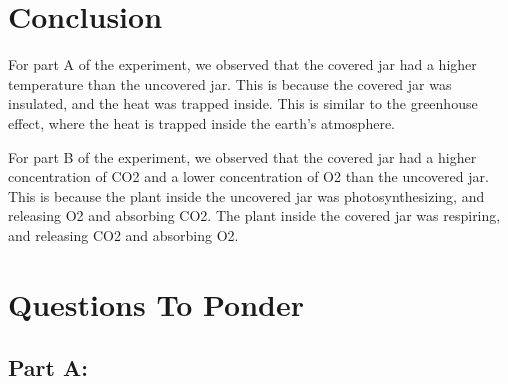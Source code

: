 \documentclass[a4paper, 12pt, english]{article}
\begin{document}
\section{Conclusion}
For part A of the experiment, we observed that the covered jar had a higher
temperature than the uncovered jar. This is because the covered jar was
insulated, and the heat was trapped inside. This is similar to the greenhouse
effect, where the heat is trapped inside the earth's atmosphere.

For part B of the experiment, we observed that the covered jar had a higher
concentration of CO2 and a lower concentration of O2 than the uncovered jar.
This is because the plant inside the uncovered jar was photosynthesizing, and
releasing O2 and absorbing CO2. The plant inside the covered jar was
respiring, and releasing CO2 and absorbing O2.

\section{Questions To Ponder}
\subsection{Part A:}
\end{document}
